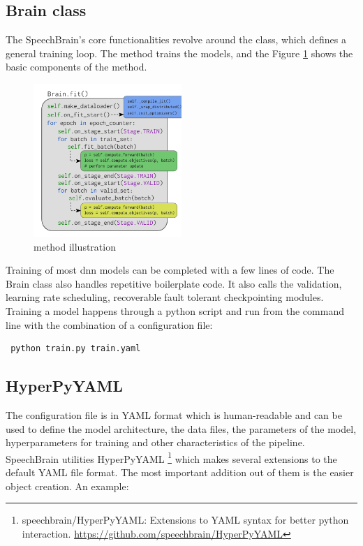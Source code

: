 \subsection{Brain class}
The SpeechBrain's core functionalities revolve around the  class, which defines a general training loop. The  method trains the models, and the Figure \ref{fig:brain} shows the basic components of the method. 

\begin{figure}[ht]
  \begin{center}
    \includegraphics[width=0.5\textwidth]{images/brainclass.png} 
    \caption{ method illustration \cite{Ravanelli2021SpeechBrain:Toolkit}}
    \label{fig:brain}
  \end{center}
\end{figure}

Training of most \acrshort{dnn} models can be completed with a few lines of code. The Brain class also handles repetitive boilerplate code. It also calls the validation, learning rate scheduling, recoverable fault tolerant checkpointing modules. Training a model happens through a python script and run from the command line with the combination of a configuration file: 
\begin{verbatim} python train.py train.yaml\end{verbatim}

\subsection{HyperPyYAML}
The configuration file is in YAML format which is human-readable and can be used to define the model architecture, the data files, the parameters of the model, hyperparameters for training and other characteristics of the pipeline. SpeechBrain utilities HyperPyYAML \footnote{speechbrain/HyperPyYAML:  Extensions  to  YAML  syntax  for  better python interaction. \href{https://github.com/speechbrain/HyperPyYAML}{https://github.com/speechbrain/HyperPyYAML} } which makes several extensions to the default YAML file format. The most important addition out of them is the easier object creation. An example:


